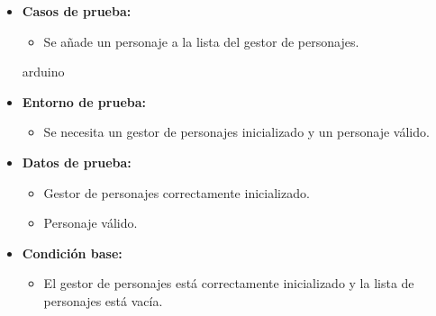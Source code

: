 \documentclass{article}
\begin{document}
\begin{itemize}
	\item \textbf{Casos de prueba:}
	\begin{itemize}
		\item Se añade un personaje a la lista del gestor de personajes.
	\end{itemize}
	
	arduino
	
	\item \textbf{Entorno de prueba:}
	\begin{itemize}
		\item Se necesita un gestor de personajes inicializado y un personaje válido.
	\end{itemize}
	
	\item \textbf{Datos de prueba:}
	\begin{itemize}
		\item Gestor de personajes correctamente inicializado.
		\item Personaje válido.
	\end{itemize}
	
	\item \textbf{Condición base:}
	\begin{itemize}
		\item El gestor de personajes está correctamente inicializado y la lista de personajes está vacía.
	\end{itemize}
	
\end{itemize}
\end{document}
